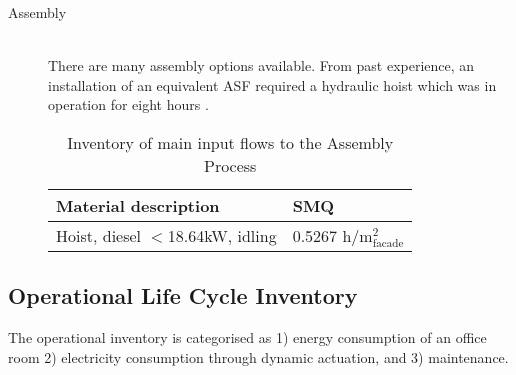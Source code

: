 \begin{description}
\item[Assembly] \hfill \\
There are many assembly options available. From past experience, an installation of an equivalent ASF required a hydraulic hoist which was in operation for eight hours \cite{jayathissa2015abs}. \\

\begin{table}[H]
\centering
\begin{tabular}{ll}
\hline
Material description & SMQ \\ \hline
Hoist, diesel  ${<}$18.64kW, idling & 0.5267 ${\mathrm{h/m^2_{facade}}}$ \\
\hline
\end{tabular}
\caption{Inventory of main input flows to the Assembly Process}
\label{tab:AssemblyInv}
\end{table}

\end{description}

\subsection{Operational Life Cycle Inventory}
\label{ch:Meth:Opp}

The operational inventory is categorised as 1) energy consumption of an office room 2) electricity consumption through dynamic actuation, and 3) maintenance.

